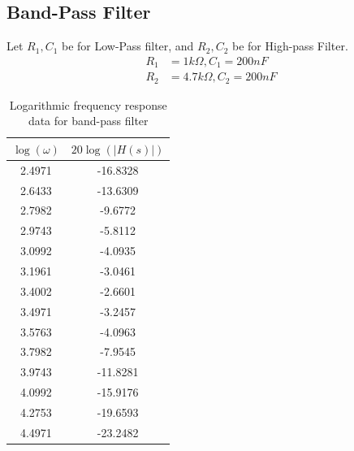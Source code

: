 \documentclass[12pt]{article}
\begin{document}
\subsection{Band-Pass Filter}
Let $R_1, C_1$ be for Low-Pass filter, and $R_2, C_2$ be for High-pass Filter.
\begin{align*}
    R_1 &= 1k\Omega, C_1 = 200nF\\
    R_2 &= 4.7k\Omega, C_2 = 200nF
\end{align*}

\begin{table}[h]
\centering
\begin{tabular}{|c|c|}
\hline
$\log(\omega)$ & $20 \log(|H(s)|)$ \\
\hline
2.4971 & -16.8328 \\
2.6433 & -13.6309 \\
2.7982 & -9.6772 \\
2.9743 & -5.8112 \\
3.0992 & -4.0935 \\
3.1961 & -3.0461 \\
3.4002 & -2.6601 \\
3.4971 & -3.2457 \\
3.5763 & -4.0963 \\
3.7982 & -7.9545 \\
3.9743 & -11.8281 \\
4.0992 & -15.9176 \\
4.2753 & -19.6593 \\
4.4971 & -23.2482 \\
\hline
\end{tabular}
\caption{Logarithmic frequency response data for band-pass filter}
\label{tab:freq_response}
\end{table}
\FloatBarrier
\end{document}
